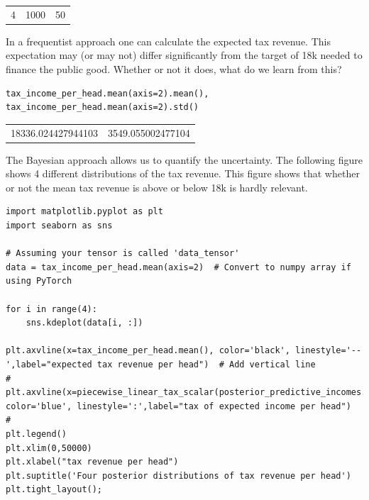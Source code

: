 \documentclass[11pt]{article}
\begin{document}
\begin{table}[htbp]
\label{}
\centering
\begin{tabular}{rrr}
4 & 1000 & 50\\
\end{tabular}
\end{table}


In a frequentist approach one can calculate the expected tax revenue. This expectation may (or may not) differ significantly from the target of 18k needed to finance the public good. Whether or not it does, what do we learn from this?

\begin{verbatim}
tax_income_per_head.mean(axis=2).mean(), tax_income_per_head.mean(axis=2).std()
\end{verbatim}

\begin{table}[htbp]
\label{}
\centering
\begin{tabular}{rr}
18336.024427944103 & 3549.055002477104\\
\end{tabular}
\end{table}

The Bayesian approach allows us to quantify the uncertainty. The following figure shows 4 different distributions of the tax revenue. This figure shows that whether or not the mean tax revenue is above or below 18k is hardly relevant.

\begin{verbatim}
import matplotlib.pyplot as plt
import seaborn as sns

# Assuming your tensor is called 'data_tensor'
data = tax_income_per_head.mean(axis=2)  # Convert to numpy array if using PyTorch

for i in range(4):
    sns.kdeplot(data[i, :])

plt.axvline(x=tax_income_per_head.mean(), color='black', linestyle='--',label="expected tax revenue per head")  # Add vertical line
# plt.axvline(x=piecewise_linear_tax_scalar(posterior_predictive_incomes.mean(),thresholds,rates), color='blue', linestyle=':',label="tax of expected income per head")  # 
plt.legend()
plt.xlim(0,50000)
plt.xlabel("tax revenue per head")
plt.suptitle('Four posterior distributions of tax revenue per head')
plt.tight_layout();

\end{verbatim}
\end{document}
